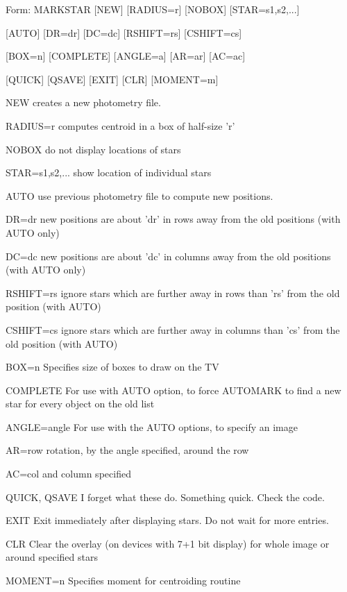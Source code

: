 {\newpage\clearpage
{}%
\begin{command}
  \item[Form: MARKSTAR {[NEW]} {[RADIUS=r]} {[NOBOX]} {[STAR=s1,s2,...]}\hfill]{}
  \item{{[AUTO]} {[DR=dr]} {[DC=dc]} {[RSHIFT=rs]} {[CSHIFT=cs]} }
  \item{{[BOX=n]} {[COMPLETE]} {[ANGLE=a]} {[AR=ar]} {[AC=ac]}}
  \item{{[QUICK]} {[QSAVE]} {[EXIT]} {[CLR]} {[MOMENT=m]}}
  \item[NEW]{creates a new photometry file.}
  \item[RADIUS=r]{computes centroid in a box of half-size 'r'}
  \item[NOBOX]{do not display locations of stars}
  \item[STAR=s1,s2,...]{show location of individual stars}
  \item[AUTO]{use previous photometry file to compute new
positions.}
  \item[DR=dr]{new positions are about 'dr' in rows away
from the old positions (with AUTO only)}
  \item[DC=dc]{new positions are about 'dc' in columns away
from the old positions (with AUTO only)}
  \item[RSHIFT=rs]{ignore stars which are further away in rows
than 'rs' from the old position (with AUTO)}
  \item[CSHIFT=cs]{ignore stars which are further away in columns
than 'cs' from the old position (with AUTO)}
  \item[BOX=n]{Specifies size of boxes to draw on the TV}
  \item[COMPLETE]{For use with AUTO option, to force AUTOMARK to
find a new star for every object on the old list}
  \item[ANGLE=angle]{     For use with the AUTO options, to specify an image}
  \item[AR=row]{rotation, by the angle specified, around the row}
  \item[AC=col]{and column specified}
  \item[QUICK, QSAVE]{I forget what these do. Something quick. Check the code.}
  \item[EXIT]{Exit immediately after displaying stars. Do not
wait for more entries.}
  \item[CLR]{Clear the overlay (on devices with 7+1 bit display)
for whole image or around specified stars}
  \item[MOMENT=n]{Specifies moment for centroiding routine}
\end{command}%
\lthtmlfigureZ
\lthtmlcheckvsize\clearpage}

